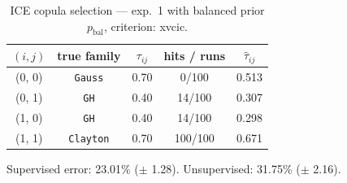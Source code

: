 \begin{table}[htbp]
  \centering
  \caption{ICE copula selection — exp.\ 1 with balanced prior $p_{\text{bal}}$, criterion: xvcic.}
  \label{tab:exp3-exp1_bal_p__xvcic}
  \begin{tabular}{ccccc}
    \toprule
    $(i, j)$ & true family & $\tau_{ij}$ & hits / runs & $\hat\tau_{ij}$ \\
    \midrule
    (0, 0) & \texttt{Gauss} & 0.70 & 0/100 & 0.513 \\
    (0, 1) & \texttt{GH} & 0.40 & 14/100 & 0.307 \\
    (1, 0) & \texttt{GH} & 0.40 & 14/100 & 0.298 \\
    (1, 1) & \texttt{Clayton} & 0.70 & 100/100 & 0.671 \\
    \bottomrule
  \end{tabular}
  \par\smallskip Supervised error: 23.01\% ($\pm$ 1.28). Unsupervised: 31.75\% ($\pm$ 2.16).
\end{table}
